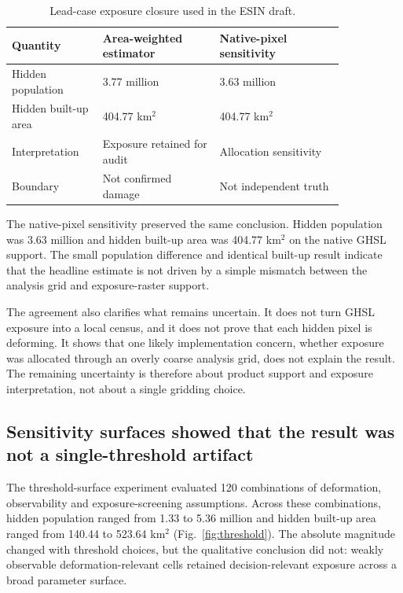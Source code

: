 \documentclass[pdflatex,sn-mathphys-ay]{sn-jnl}
\begin{document}
\begin{table}[t]
\caption{Lead-case exposure closure used in the ESIN draft.}
\label{tab:leadclosure}
\centering
\begin{tabular}{p{0.22\linewidth}p{0.30\linewidth}p{0.32\linewidth}}
\toprule
Quantity & Area-weighted estimator & Native-pixel sensitivity \\
\midrule
Hidden population & 3.77 million & 3.63 million \\
Hidden built-up area & 404.77 km$^2$ & 404.77 km$^2$ \\
Interpretation & Exposure retained for audit & Allocation sensitivity \\
Boundary & Not confirmed damage & Not independent truth \\
\bottomrule
\end{tabular}
\end{table}

The native-pixel sensitivity preserved the same conclusion. Hidden population was 3.63 million and hidden built-up area was 404.77 km$^2$ on the native GHSL support. The small population difference and identical built-up result indicate that the headline estimate is not driven by a simple mismatch between the analysis grid and exposure-raster support.

The agreement also clarifies what remains uncertain. It does not turn GHSL exposure into a local census, and it does not prove that each hidden pixel is deforming. It shows that one likely implementation concern, whether exposure was allocated through an overly coarse analysis grid, does not explain the result. The remaining uncertainty is therefore about product support and exposure interpretation, not about a single gridding choice.

\subsection{Sensitivity surfaces showed that the result was not a single-threshold artifact}

The threshold-surface experiment evaluated 120 combinations of deformation, observability and exposure-screening assumptions. Across these combinations, hidden population ranged from 1.33 to 5.36 million and hidden built-up area ranged from 140.44 to 523.64 km$^2$ (Fig.~\ref{fig:threshold}). The absolute magnitude changed with threshold choices, but the qualitative conclusion did not: weakly observable deformation-relevant cells retained decision-relevant exposure across a broad parameter surface.
\end{document}
